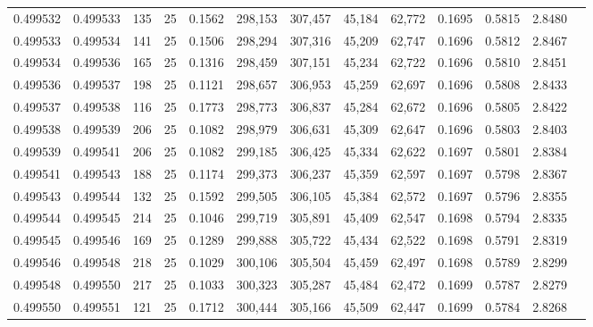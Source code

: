\begin{tabular}{rrrrrrrrrrrrr}
0.499532 & 0.499533 & 135 &  25 &                                     0.1562 & 298,153 & 307,457 &  45,184 &  62,772 & 0.1695 & 0.5815 & 2.8480 \\
0.499533 & 0.499534 & 141 &  25 &                                     0.1506 & 298,294 & 307,316 &  45,209 &  62,747 & 0.1696 & 0.5812 & 2.8467 \\
0.499534 & 0.499536 & 165 &  25 &                                     0.1316 & 298,459 & 307,151 &  45,234 &  62,722 & 0.1696 & 0.5810 & 2.8451 \\
0.499536 & 0.499537 & 198 &  25 &                                     0.1121 & 298,657 & 306,953 &  45,259 &  62,697 & 0.1696 & 0.5808 & 2.8433 \\
0.499537 & 0.499538 & 116 &  25 &                                     0.1773 & 298,773 & 306,837 &  45,284 &  62,672 & 0.1696 & 0.5805 & 2.8422 \\
0.499538 & 0.499539 & 206 &  25 &                                     0.1082 & 298,979 & 306,631 &  45,309 &  62,647 & 0.1696 & 0.5803 & 2.8403 \\
0.499539 & 0.499541 & 206 &  25 &                                     0.1082 & 299,185 & 306,425 &  45,334 &  62,622 & 0.1697 & 0.5801 & 2.8384 \\
0.499541 & 0.499543 & 188 &  25 &                                     0.1174 & 299,373 & 306,237 &  45,359 &  62,597 & 0.1697 & 0.5798 & 2.8367 \\
0.499543 & 0.499544 & 132 &  25 &                                     0.1592 & 299,505 & 306,105 &  45,384 &  62,572 & 0.1697 & 0.5796 & 2.8355 \\
0.499544 & 0.499545 & 214 &  25 &                                     0.1046 & 299,719 & 305,891 &  45,409 &  62,547 & 0.1698 & 0.5794 & 2.8335 \\
0.499545 & 0.499546 & 169 &  25 &                                     0.1289 & 299,888 & 305,722 &  45,434 &  62,522 & 0.1698 & 0.5791 & 2.8319 \\
0.499546 & 0.499548 & 218 &  25 &                                     0.1029 & 300,106 & 305,504 &  45,459 &  62,497 & 0.1698 & 0.5789 & 2.8299 \\
0.499548 & 0.499550 & 217 &  25 &                                     0.1033 & 300,323 & 305,287 &  45,484 &  62,472 & 0.1699 & 0.5787 & 2.8279 \\
0.499550 & 0.499551 & 121 &  25 &                                     0.1712 & 300,444 & 305,166 &  45,509 &  62,447 & 0.1699 & 0.5784 & 2.8268 \\

\end{tabular}
